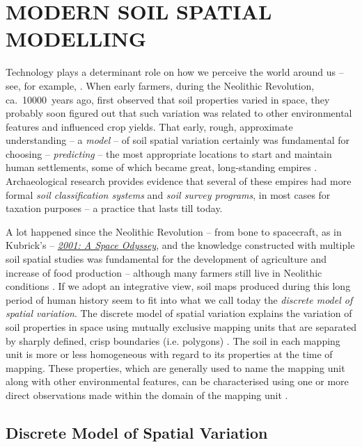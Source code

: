 \section{MODERN SOIL SPATIAL MODELLING}

Technology plays a determinant role on how we perceive the world around us -- see, for example, 
. When early farmers, during the Neolithic Revolution, ca.~\num{10000}~years ago, 
first observed that soil properties varied in space, they probably soon figured out that such variation was 
related to other environmental features and influenced crop yields. That early, rough, approximate 
understanding -- a \emph{model} -- of soil spatial variation certainly was fundamental for choosing -- 
\emph{predicting} -- the most appropriate locations to start and maintain human settlements, some of which 
became great, long-standing empires \cite{MazoyerEtAl2008, BrevikEtAl2010, Churchman2010}. Archaeological 
research provides evidence that several of these empires had more formal \emph{soil classification systems} and 
\emph{soil survey programs}, in most cases for taxation purposes \cite{Barrera-BassolsEtAl2003} -- a practice 
that lasts till today.

\def\footKubrick{\href{https://www.youtube.com/watch?v=qtbOmpTnyOc}{\textit{2001: A Space Odyssey}}}

A lot happened since the Neolithic Revolution \cite{BrevikEtAl2010} -- from bone to spacecraft, as in Kubrick's 
-- \footKubrick,
and the knowledge constructed with multiple soil spatial studies was fundamental for the development of 
agriculture and increase of food production -- although many farmers still live in Neolithic conditions 
\cite{MazoyerEtAl2008}. If we adopt an integrative view, soil maps produced during this long period of human 
history seem to fit into what we call today the \emph{discrete model of
spatial variation}. The discrete model of spatial variation explains the variation of soil properties in space 
using mutually exclusive mapping units that are separated by sharply defined, crisp boundaries (i.e. polygons) 
\cite{Heuvelink1996, Legros2006}. The soil in each mapping unit is more or less homogeneous with regard to its 
properties at the time of mapping. These properties, which are generally used to name the mapping unit along 
with other environmental features, can be characterised using one or more direct observations made within the 
domain of the mapping unit \cite{WebsterEtAl1990, Legros2006}.

\subsection{Discrete Model of Spatial Variation}

